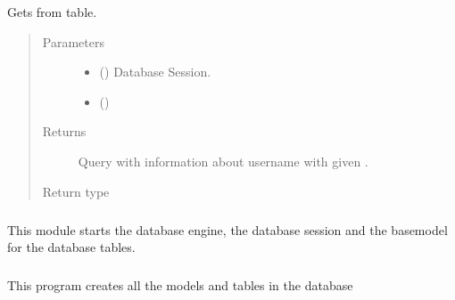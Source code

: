 \documentclass[a4paper,landscape,10pt,english]{sphinxmanual}
\begin{document}
\begin{fulllineitems}
\label{\detokenize{code_docs/simulation_api.model:simulation_api.model.crud._get_username}}
Gets  from  table.
\begin{quote}\begin{description}
\item[{Parameters}] \leavevmode\begin{itemize}
\item {} 
 () \textendash{} Database Session.

\item {} 
 () \textendash{} 

\end{itemize}

\item[{Returns}] \leavevmode
Query with information about username with given .

\item[{Return type}] \leavevmode
{}

\end{description}\end{quote}

\end{fulllineitems}



\subparagraph{}
\label{\detokenize{code_docs/simulation_api.model:module-simulation_api.model.db_manager}}\label{\detokenize{code_docs/simulation_api.model:simulation-api-model-db-manager}}
This module starts the database engine, the database session and the
basemodel for the database tables.


\subparagraph{}
\label{\detokenize{code_docs/simulation_api.model:module-simulation_api.model.models}}\label{\detokenize{code_docs/simulation_api.model:simulation-api-model-models}}
This program creates all the models and tables in the database
\end{document}

